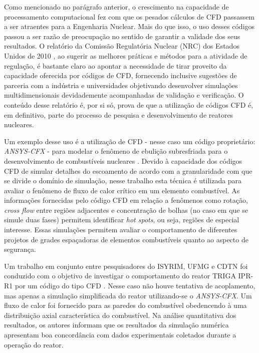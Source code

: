 Como mencionado no parágrafo anterior, o crescimento na capacidade de processamento
computacional 
fez com que os pesados cálculos de CFD passassem a ser atraentes 
para a Engenharia Nuclear. Mais do que isso, o uso desses códigos passou a ser razão 
de preocupação no sentido de garantir a validade dos seus resultados. O relatório 
da Comissão Regulatória Nuclear (NRC) dos Estados Unidos de 2010 \cite[p.69]{NUREG2010}, 
ao sugerir as melhores práticas e métodos para a atividade de regulação, é bastante claro 
ao apontar a necessidade de tirar proveito da capacidade oferecida por códigos de CFD, 
fornecendo inclusive sugestões de parceria com a indústria e universidades objetivando 
desenvolver simulações multidimensionais devidademente acompanhadas de validação e
verificação. O conteúdo desse relatório é, por si só, prova de que a utilização de 
códigos CFD é, em definitivo, parte do processo de 
pesquisa e desenvolvimento de reatores nucleares. 

Um exemplo desse uso é a utilização de CFD - nesse caso um código proprietário: 
\textit{ANSYS-CFX} - para modelar o fenômeno de ebulição subresfriada para o 
desenvolvimento de combustíveis nucleares \cite{Krepper2007}. Devido à capacidade 
dos códigos CFD de simular detalhes do escoamento de acordo com a granularidade com que se
divide o domínio de simulação, nesse trabalho esta técnica é utilizada para avaliar 
o fenômeno de fluxo de calor crítico em um elemento combustível. As informações 
fornecidas pelo código CFD em relação a fenômenos como rotação, \textit{cross flow} entre 
regiões adjacentes e concentração de bolhas (no caso em que se simule duas fases)
permitem identificar \textit{hot spots}, ou seja, regiões de especial interesse.
Essas simulações permitem avaliar o comportamento
de diferentes projetos de grades espaçadoras de elementos combustíveis quanto ao aspecto 
de segurança.

Um trabalho em conjunto entre pesquisadores do ISYRIM, UFMG e CDTN foi conduzido
com o objetivo de investigar o comportamento do reator TRIGA IPR-R1 por um código do tipo CFD \cite{Martinez2012}. 
Nesse caso não houve tentativa de acoplamento, mas apenas a simulação simplificada 
do reator utilizando-se o \textit{ANSYS-CFX}. Um fluxo de calor 
foi fornecido para as paredes do combustível obedencendo à uma distribuição axial 
característica do combustível. Na análise quantitativa dos resultados, os autores 
informam que os resultados da simulação numérica apresentam boa concordância com 
dados experimentais coletados durante a operação do reator.

